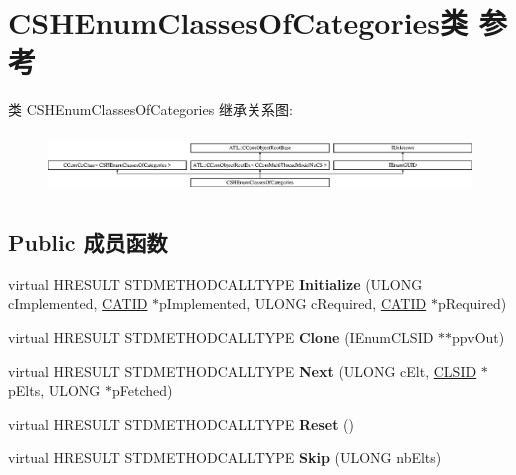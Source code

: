 \hypertarget{class_c_s_h_enum_classes_of_categories}{}\section{C\+S\+H\+Enum\+Classes\+Of\+Categories类 参考}
\label{class_c_s_h_enum_classes_of_categories}
类 C\+S\+H\+Enum\+Classes\+Of\+Categories 继承关系图\+:\begin{figure}[H]
\begin{center}
\leavevmode
\includegraphics[height=1.590909cm]{class_c_s_h_enum_classes_of_categories}
\end{center}
\end{figure}
\subsection*{Public 成员函数}
\begin{DoxyCompactItemize}
\item 
\mbox{\label{class_c_s_h_enum_classes_of_categories_a57c273c482aa6b3a98f79050a1337b73}} 
virtual H\+R\+E\+S\+U\+LT S\+T\+D\+M\+E\+T\+H\+O\+D\+C\+A\+L\+L\+T\+Y\+PE {\bfseries Initialize} (U\+L\+O\+NG c\+Implemented, \hyperlink{interface_g_u_i_d}{C\+A\+T\+ID} $\ast$p\+Implemented, U\+L\+O\+NG c\+Required, \hyperlink{interface_g_u_i_d}{C\+A\+T\+ID} $\ast$p\+Required)
\item 
\mbox{\label{class_c_s_h_enum_classes_of_categories_a4b2f306a39faf6fb20254412e80b82ce}} 
virtual H\+R\+E\+S\+U\+LT S\+T\+D\+M\+E\+T\+H\+O\+D\+C\+A\+L\+L\+T\+Y\+PE {\bfseries Clone} (I\+Enum\+C\+L\+S\+ID $\ast$$\ast$ppv\+Out)
\item 
\mbox{\label{class_c_s_h_enum_classes_of_categories_a82544dbb73cbf58cb7715a845fad4292}} 
virtual H\+R\+E\+S\+U\+LT S\+T\+D\+M\+E\+T\+H\+O\+D\+C\+A\+L\+L\+T\+Y\+PE {\bfseries Next} (U\+L\+O\+NG c\+Elt, \hyperlink{struct___i_i_d}{C\+L\+S\+ID} $\ast$p\+Elts, U\+L\+O\+NG $\ast$p\+Fetched)
\item 
\mbox{\label{class_c_s_h_enum_classes_of_categories_a062b9d312c01c815558f10eba293c0ef}} 
virtual H\+R\+E\+S\+U\+LT S\+T\+D\+M\+E\+T\+H\+O\+D\+C\+A\+L\+L\+T\+Y\+PE {\bfseries Reset} ()
\item 
\mbox{\label{class_c_s_h_enum_classes_of_categories_aba5b92b5b4572f7d3b260675d778b491}} 
virtual H\+R\+E\+S\+U\+LT S\+T\+D\+M\+E\+T\+H\+O\+D\+C\+A\+L\+L\+T\+Y\+PE {\bfseries Skip} (U\+L\+O\+NG nb\+Elts)
\end{DoxyCompactItemize}
